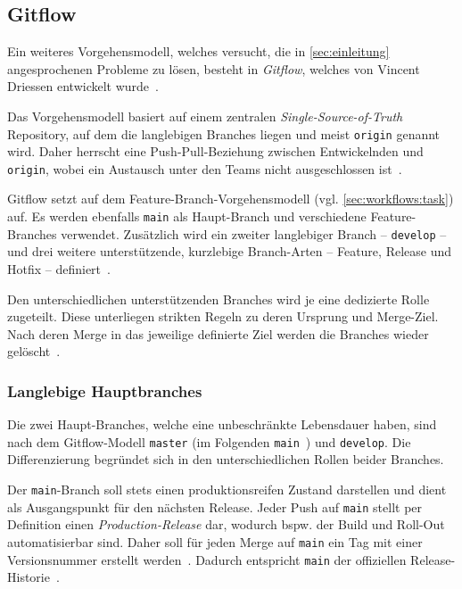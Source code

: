 
\subsection{Gitflow}
\label{sec:workflows:gitflow}

Ein weiteres Vorgehensmodell, welches versucht, die in \autoref{sec:einleitung} angesprochenen Probleme zu lösen, besteht in \emph{Gitflow}, welches \citeyear{driessenSuccessfulGitBranching2010} von Vincent Driessen entwickelt wurde~\cite{driessenSuccessfulGitBranching2010}.

Das Vorgehensmodell basiert auf einem zentralen \emph{Single\hyp Source\hyp of\hyp Truth} Repository, auf dem die langlebigen Branches liegen und meist \texttt{origin} genannt wird. Daher herrscht eine Push\hyp Pull\hyp Beziehung zwischen Entwickelnden und \texttt{origin}, wobei ein Austausch unter den Teams nicht ausgeschlossen ist~\cite{driessenSuccessfulGitBranching2010}.

Gitflow setzt auf dem Feature\hyp Branch\hyp Vorgehensmodell (vgl. \autoref{sec:workflows:task}) auf. Es werden ebenfalls \texttt{main} als Haupt\hyp Branch und verschiedene Feature\hyp Branches verwendet. Zusätzlich wird ein zweiter langlebiger Branch -- \texttt{develop} -- und drei weitere unterstützende, kurzlebige Branch\hyp Arten -- Feature, Release und Hotfix -- definiert~\cite{driessenSuccessfulGitBranching2010}.

Den unterschiedlichen unterstützenden Branches wird je eine dedizierte Rolle zugeteilt. Diese unterliegen strikten Regeln zu deren Ursprung und Merge\hyp Ziel. Nach deren Merge in das jeweilige definierte Ziel werden die Branches wieder gelöscht~\cite{driessenSuccessfulGitBranching2010}.


\subsubsection{Langlebige Hauptbranches}

Die zwei Haupt\hyp Branches, welche eine unbeschränkte Lebensdauer haben, sind nach dem Gitflow\hyp Modell \texttt{master} (im Folgenden \texttt{main}~\cite{githubincRenamingDefaultBranch2022,softwarefreedomconservancyRegardingGitBranch2020}) und \texttt{develop}. Die Differenzierung begründet sich in den unterschiedlichen Rollen beider Branches.

Der \texttt{main}-Branch soll stets einen produktionsreifen Zustand darstellen und dient als Ausgangspunkt für den nächsten Release. Jeder Push auf \texttt{main} stellt per Definition einen \emph{Production-Release} dar, wodurch bspw. der Build und Roll-Out automatisierbar sind. Daher soll für jeden Merge auf \texttt{main} ein Tag mit einer Versionsnummer erstellt werden~\cite{driessenSuccessfulGitBranching2010}. Dadurch entspricht \texttt{main} der offiziellen Release\hyp Historie~\cite{atlassianGitflowWorkflow}.

